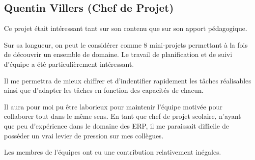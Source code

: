 \subsection{Quentin Villers (Chef de Projet)}

Ce projet était intéressant tant sur son contenu que sur son apport pédagogique. 

Sur sa longueur, on peut le considérer comme 8 mini-projets permettant à la fois de découvrir 
un ensemble de domaine. Le travail de planification et de suivi d'équipe a été particulièrement intéressant.

Il me permettra de mieux chiffrer et d'indentifier rapidement les tâches réalisables ainsi 
que d'adapter les tâches en fonction des capacités de chacun. 

Il aura pour moi pu être laborieux pour maintenir l'équipe motivée pour collaborer 
tout dans le même sens. En tant que chef de projet scolaire, n'ayant que peu d'expérience
dans le domaine des ERP, il me paraissait difficile de posséder un vrai levier de pression 
sur mes collègues.

Les membres de l'équipes ont eu une contribution relativement inégales.
